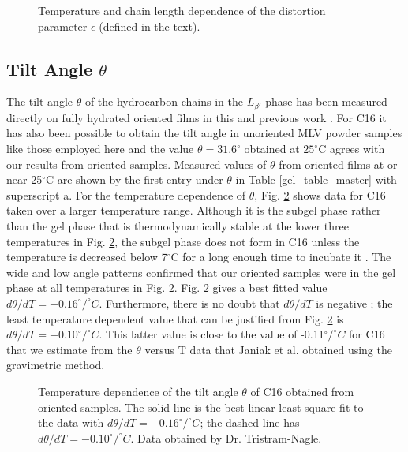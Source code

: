 \begin{figure}
\centerline {}
\caption{Temperature and chain length dependence 
of the distortion parameter $\epsilon$ (defined in the text).
\label{gel_dis}}
\end{figure}

\subsection{Tilt Angle $\theta$}
The tilt angle $\theta$ of the hydrocarbon chains in the $L_{\beta'}$
phase has been measured directly on fully hydrated oriented films 
in this and previous work \cite{STN92}.  For C16 it has 
also been possible to obtain
the tilt angle in unoriented MLV powder samples 
\cite{Sun94} like those employed here and the value 
$\theta = 31.6^{\circ}$ obtained at $25^{\circ}$C agrees
with our results from oriented samples.  
Measured values of $\theta$ from oriented films at or near 25$^{\circ}$C
are shown by the first entry under $\theta$ in Table \ref{gel_table_master} 
with superscript a.  For the temperature dependence of $\theta$, 
Fig. \ref{gel_tlt} shows data for C16 taken over a larger temperature range. 
Although it is the subgel phase rather than the gel phase that is 
thermodynamically stable
at the lower three temperatures in Fig. \ref{gel_tlt}, the subgel phase 
does not
form in C16 unless the temperature is decreased below 7$^{\circ}$C
for a long enough time to incubate it \cite{NW82}. The wide and
low angle patterns confirmed that our oriented samples were in the
gel phase at all temperatures in Fig. \ref{gel_tlt}.
Fig. \ref{gel_tlt} gives
a best fitted value $d{\theta}/dT = -0.16^{\circ}/^{\circ}C$. 
Furthermore, there is no doubt that $d{\theta}/dT$ is negative 
\cite{JanSS76,Kir94};
the least temperature dependent value that can be justified from
Fig. \ref{gel_tlt} is $d{\theta}/dT = -0.10^{\circ}/^{\circ}C$.
This latter value is close to the value of -0.11$^{\circ}/^{\circ}C$
for C16 that we estimate from the $\theta$ versus T data
that Janiak et al. \cite{JanSS76} obtained using the gravimetric method.

\begin{figure}
\centerline {}
\caption{Temperature dependence of the tilt angle $\theta$ of
C16 obtained from oriented samples. The solid line is
the best linear least-square fit to the data with 
$d{\theta}/dT = -0.16^{\circ}/^{\circ}C$; the dashed line has 
$d{\theta}/dT = -0.10^{\circ}/^{\circ}C$.
Data obtained by Dr. Tristram-Nagle.
\label{gel_tlt}}
\end{figure}

